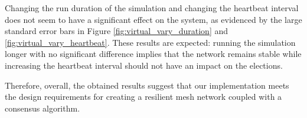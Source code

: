Changing the run duration of the simulation and changing the heartbeat interval does not seem to have a significant effect on the system, as evidenced by the large standard error bars in Figure \ref{fig:virtual_vary_duration} and \ref{fig:virtual_vary_heartbeat}. These results are expected: running the simulation longer with no significant difference implies that the network remains stable while increasing the heartbeat interval should not have an impact on the elections. 

Therefore, overall, the obtained results suggest that our implementation meets the design requirements for creating a resilient mesh network coupled with a consensus algorithm.